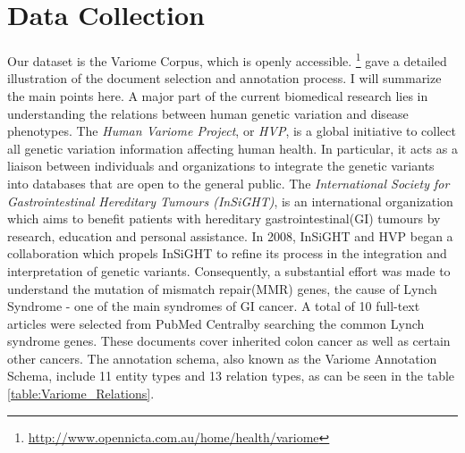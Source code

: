 \section{Data Collection} %
Our dataset is the Variome Corpus\cite{verspoor2013annotating}, which is openly accessible. \footnote{\href{http://www.opennicta.com.au/home/health/variome}\url{http://www.opennicta.com.au/home/health/variome}} \citet{verspoor2013annotating} gave a detailed illustration of the document selection and annotation process. I will summarize the main points here.\newline\newline
A major part of the current biomedical research lies in understanding the relations between human genetic variation and disease phenotypes. The \emph{Human Variome Project}, or \emph{HVP}, is a global initiative to collect all genetic variation information affecting human health\cite{ring2006human}. In particular, it acts as a liaison between individuals and organizations to integrate the genetic variants into databases that are open to the general public\cite{verspoor2013annotating}. The \emph{International Society for Gastrointestinal Hereditary Tumours (InSiGHT)}, is an international organization which aims to benefit patients with hereditary gastrointestinal(GI) tumours by research, education and personal assistance. In 2008, InSiGHT and HVP began a collaboration which propels InSiGHT to refine its process in the integration and interpretation of genetic variants. Consequently, a substantial effort was made to understand the mutation of mismatch repair(MMR) genes, the cause of Lynch Syndrome - one of the main syndromes of GI cancer\cite{silva2009mismatch}. A total of 10 full-text articles were selected from PubMed Central\textregistered  by searching the common Lynch syndrome genes. These documents cover inherited colon cancer as well as certain other cancers. The annotation schema, also known as the Variome Annotation Schema\cite{verspoor2013annotating}, include 11 entity types and 13 relation types, as can be seen in the table \ref{table:Variome_Relations}.\newline \newline
